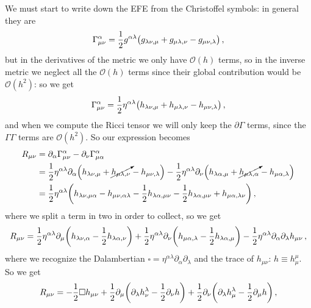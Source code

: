 \documentclass[main.tex]{subfiles}
\begin{document}
We must start to write down the EFE from the Christoffel symbols: in general they are 
%
\begin{align}
\Gamma^{\alpha }_{\mu \nu } = \frac{1}{2} g^{\alpha \lambda } \qty(g_{\lambda \nu , \mu } + g_{\mu \lambda , \nu } - g_{\mu \nu , \lambda })
\,,
\end{align}
%
but in the derivatives of the metric we only have \(\mathcal{O}(h)\) terms, so in the inverse metric we neglect all the \(\mathcal{O}(h)\) terms since their global contribution would be \(\mathcal{O}(h^2)\): so we get 
%
\begin{align}
    \Gamma^{\alpha }_{\mu \nu } = \frac{1}{2} \eta ^{\alpha \lambda } \qty(h_{\lambda \nu , \mu } + h_{\mu \lambda , \nu } - h_{\mu \nu , \lambda })
\,,
\end{align}
%
and when we compute the Ricci tensor we will only keep the \(\partial \Gamma \) terms, since the \(\Gamma \Gamma \) terms are \(\mathcal{O}(h^2)\). So our expression becomes 
%
\begin{align}
R_{\mu \nu } &= \partial_{\alpha } \Gamma^{\alpha }_{\mu \nu } - \partial_{\nu } \Gamma^{\alpha }_{\mu \alpha }  \\
&= \frac{1}{2} \eta^{\alpha \lambda } \partial_{\alpha } \qty(h_{\lambda \nu , \mu } + \cancelto{}{h_{\mu \lambda , \nu }} - h_{\mu \nu , \lambda }) - \frac{1}{2} \eta^{\alpha \lambda } \partial_{\nu  }\qty(h_{\lambda \alpha , \mu } + \cancelto{}{h_{\mu \lambda , \alpha }} - h_{\mu \alpha , \lambda })  \\
&= \frac{1}{2} \eta^{\alpha \lambda } \qty(h_{\lambda \nu , \mu \alpha } - h_{\mu \nu , \alpha \lambda } - \frac{1}{2} h_{\lambda \alpha , \mu \nu } - \frac{1}{2} h_{\lambda \alpha , \mu \nu } + h_{\mu \alpha , \lambda \nu } )
\,,
\end{align}
%
where we split a term in two in order to collect, so we get 
%
\begin{align}
R_{\mu \nu } = \frac{1}{2} \eta^{\alpha \lambda } \partial_{\mu } \qty(h_{\lambda \nu , \alpha } - \frac{1}{2} h_{\lambda \alpha , \nu })
+ \frac{1}{2} \eta^{\alpha \lambda } \partial_{\nu } 
\qty(h_{\mu \alpha , \lambda } - \frac{1}{2} h_{\lambda \alpha , \mu })- \frac{1}{2} \eta^{\alpha \lambda } \partial_{\alpha } \partial_{\lambda } h_{\mu \nu }
\,,
\end{align}
%
where we recognize the Dalambertian \(\square = \eta^{\alpha \lambda  }  \partial_{\alpha } \partial_{\lambda }\) and the trace of \(h_{\mu \nu }\): \(h \equiv h^{\mu }_{\mu }\). So we get 
%
\begin{align}
R_{\mu \nu } = - \frac{1}{2} \square h_{\mu \nu } 
+ \frac{1}{2} \partial_{\mu } \qty(\partial_{\lambda } h^{\lambda }_{\nu } - \frac{1}{2} \partial_{\nu }h)
+ \frac{1}{2} \partial_{\nu }\qty(\partial_{\lambda}  h^{\lambda }_{\mu } - \frac{1}{2} \partial_{\mu} h)
\,,
\end{align}
\end{document}
